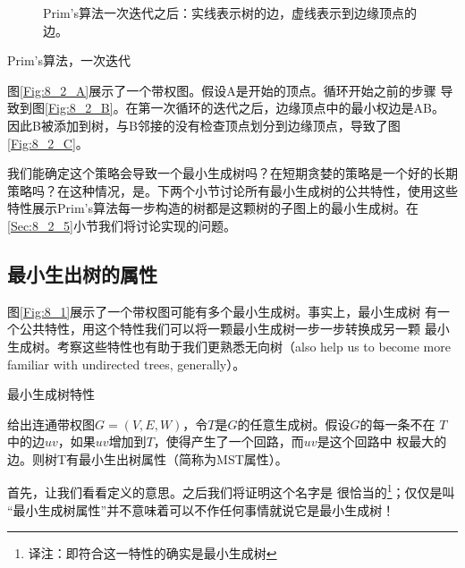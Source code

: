 \begin{figure*}[!t]
{
        \label{Fig:8_2_C}
    }
    \caption{Prim's算法一次迭代之后：实线表示树的边，虚线表示到边缘顶点的边。}
    \label{Fig:8_2}
\end{figure*}

\begin{example}
Prim's算法，一次迭代

图\ref{Fig:8_2_A}展示了一个带权图。假设A是开始的顶点。循环开始之前的步骤
导致到图\ref{Fig:8_2_B}。在第一次循环的迭代之后，边缘顶点中的最小权边是AB。
因此B被添加到树，与B邻接的没有检查顶点划分到边缘顶点，导致了图\ref{Fig:8_2_C}。
\end{example}

我们能确定这个策略会导致一个最小生成树吗？在短期贪婪的策略是一个好的长期
策略吗？在这种情况，是。下两个小节讨论所有最小生成树的公共特性，使用这些
特性展示Prim's算法每一步构造的树都是这颗树的子图上的最小生成树。在
\ref{Sec:8_2_5}小节我们将讨论实现的问题。

\subsection{最小生出树的属性}\label{Sec:PropertiesOfMST}
图\ref{Fig:8_1}展示了一个带权图可能有多个最小生成树。事实上，最小生成树
有一个公共特性，用这个特性我们可以将一颗最小生成树一步一步转换成另一颗
最小生成树。考察这些特性也有助于我们更熟悉无向树（also help us to become
 more familiar with undirected trees, generally）。

\begin{definition}
最小生成树特性

给出连通带权图$G=(V, E, W)$，令$T$是$G$的任意生成树。假设$G$的每一条不在
$T$中的边$uv$，如果$uv$增加到$T$，使得产生了一个回路，而$uv$是这个回路中
权最大的边。则树T有最小生出树属性（简称为MST属性）。
\end{definition}

首先，让我们看看定义的意思。之后我们将证明这个名字是
很恰当的\footnote{译注：即符合这一特性的确实是最小生成树}；仅仅是叫
“最小生成树属性”并不意味着可以不作任何事情就说它是最小生成树！

